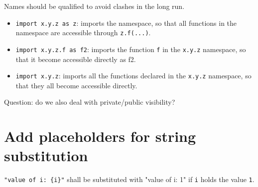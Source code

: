 \documentclass[11pt]{report}
\begin{document}
Names should be qualified to avoid clashes in the long run.

\begin{itemize}
\item \texttt{import x.y.z as z}: imports the namespace, so that all functions in the namespace are accessible through \texttt{z.f(...)}.
\item \texttt{import x.y.z.f as f2}: imports the function \texttt{f} in the \texttt{x.y.z} namespace, so that it become accessible directly as f2.
\item \texttt{import x.y.z}: imports all the functions declared in the \texttt{x.y.z} namespace, so that they all become accessible directly.
\end{itemize}

Question: do we also deal with private/public visibility?

\section{Add placeholders for string substitution}

\texttt{"value of i: \{i\}"} shall be substituted with "value of i: 1" if \texttt{i} holds the value \texttt{1}.

\end{document}

